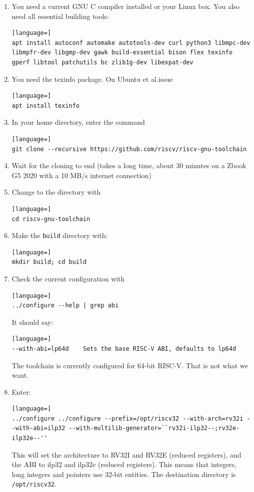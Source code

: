 \documentclass[12pt]{article}
\begin{document}
\begin{enumerate}
\item You need a current GNU C compiler installed or your Linux box. You also need all essential building tools:
\begin{lstlisting}[language=]
apt install autoconf automake autotools-dev curl python3 libmpc-dev libmpfr-dev libgmp-dev gawk build-essential bison flex texinfo gperf libtool patchutils bc zlib1g-dev libexpat-dev
\end{lstlisting}
\item You need the texinfo package. On Ubuntu et al.\@ issue
\begin{lstlisting}[language=]
apt install texinfo
\end{lstlisting}
\item In your home directory, enter the command
\begin{lstlisting}[language=]
git clone --recursive https://github.com/riscv/riscv-gnu-toolchain
\end{lstlisting}
\item Wait for the cloning to end (takes a long time, about 30 minutes on a Zbook G5 2020 with a 10 MB/s internet connection)
\item Change to the directory with
\begin{lstlisting}[language=]
cd riscv-gnu-toolchain
\end{lstlisting}
\item Make the \texttt{build} directory with:
\begin{lstlisting}[language=]
mkdir build; cd build
\end{lstlisting}
\item Check the current configuration with
\begin{lstlisting}[language=]
../configure --help | grep abi
\end{lstlisting}
      It should say:
\begin{lstlisting}[language=]
--with-abi=lp64d    Sets the base RISC-V ABI, defaults to lp64d
\end{lstlisting}
The toolchain is currently configured for 64-bit RISC-V. That is not what we want.
\item Enter:
\begin{lstlisting}[language=]
../configure ../configure --prefix=/opt/riscv32 --with-arch=rv32i --with-abi=ilp32 --with-multilib-generator=``rv32i-ilp32--;rv32e-ilp32e--''
\end{lstlisting}
This will set the architecture to RV32I and RV32E (reduced registers), and the ABI to ilp32 and ilp32e (reduced registers). This means that integers, long integers and pointers use 32-bit entities. The destination directory is \lstinline|/opt/riscv32|.


\end{enumerate}
\end{document}
